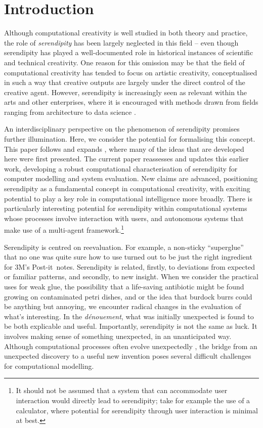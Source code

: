 \section{Introduction}

Although computational creativity is well studied in both theory and
practice, the role of \emph{serendipity} has been largely neglected
in this field -- even though serendipity has played a well-documented
role in historical instances of scientific and technical creativity.
One reason for this omission may be that the field of computational
creativity has tended to focus on artistic creativity, conceptualised in such a way that creative outputs are largely under the direct control of the creative agent.  However,  serendipity is increasingly seen as relevant within the arts
\cite{mckay-serendipity} and other enterprises, where it is encouraged with methods drawn from fields ranging from architecture to data science \cite{kakko2009homo,engineering-serendipity}. 


An interdisciplinary perspective on the phenomenon of serendipity
promises further illumination.  Here, we consider the potential for
formalising this concept. 
  This paper follows and expands , where many of the ideas that are developed here were first presented.  The current paper reassesses and updates this earlier work, developing a robust computational characterisation of serendipity for computer modelling and system evaluation. New claims are advanced, positioning serendipity as a fundamental concept in computational creativity, with exciting potential to play a key role in computational intelligence more broadly.  There is particularly interesting potential for serendipity within computational systems whose processes involve interaction with users, and autonomous systems that make use of a multi-agent framework.\footnote{It should not be assumed that a system that can accommodate user interaction would directly lead to serendipity; take for example the use of a calculator, where potential for serendipity through user interaction is minimal at best.}

Serendipity is centred on reevaluation.  For example, a
non-sticky ``superglue'' that no one was quite sure how to use turned
out to be just the right ingredient for 3M's
Post-it\texttrademark\ notes.
%
Serendipity is related, firstly, to deviations from expected or
familiar patterns, and secondly, to new insight.
%
When we consider the practical uses for weak glue, the possibility
that a life-saving antibiotic might be found growing on contaminated
petri dishes, and or the idea that burdock burrs could be anything but
annoying, we encounter radical changes in the evaluation of what's
interesting.  In the \emph{d\'enouement}, what was initially
unexpected is found to be both explicable and useful.  Importantly,
serendipity is not the same as luck.  It involves making sense of
something unexpected, in an unanticipated way.  Although computational
processes often evolve unexpectedly
\cite{minsky1967programming}, the bridge from an unexpected discovery
to a useful new invention poses several difficult challenges for
computational modelling.

